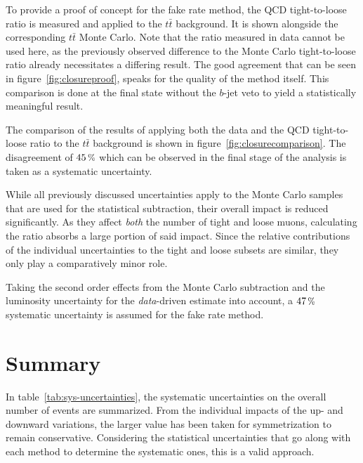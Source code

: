 To provide a proof of concept for the fake rate method, the QCD tight-to-loose ratio is measured and applied to the $t\bar{t}$ background. It is shown alongside the corresponding $t\bar{t}$ Monte Carlo. Note that the ratio measured in data cannot be used here, as the previously observed difference to the Monte Carlo tight-to-loose ratio already necessitates a differing result. The good agreement that can be seen in figure~\ref{fig:closureproof}, speaks for the quality of the method itself. This comparison is done at the final state without the $b$-jet veto to yield a statistically meaningful result.

The comparison of the results of applying both the data and the QCD tight-to-loose ratio to the $t\bar{t}$ background is shown in figure~\ref{fig:closurecomparison}. The disagreement of $45\,\pct$ which can be observed in the final stage of the analysis is taken as a systematic uncertainty.

While all previously discussed uncertainties apply to the Monte Carlo samples that are used for the statistical subtraction, their overall impact is reduced significantly. As they affect \textit{both} the number of tight and loose muons, calculating the ratio absorbs a large portion of said impact. Since the relative contributions of the individual uncertainties to the tight and loose subsets are similar, they only play a comparatively minor role.

Taking the second order effects from the Monte Carlo subtraction and the luminosity uncertainty for the \textit{data}-driven estimate into account, a $47\,\pct$ systematic uncertainty is assumed for the fake rate method.


\section{Summary}
\label{sec:summary}

In table~\ref{tab:sys-uncertainties}, the systematic uncertainties on the overall number of events are summarized. From the individual impacts of the up- and downward variations, the larger value has been taken for symmetrization to remain conservative. Considering the statistical uncertainties that go along with each method to determine the systematic ones, this is a valid approach.

